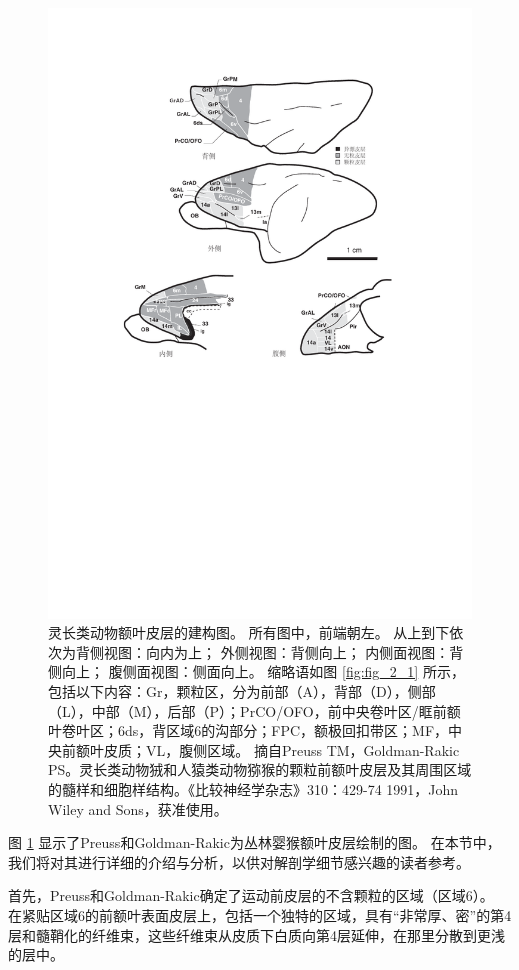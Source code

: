 \begin{figure}[!htb]
	\centering
	\includegraphics[width=0.8\linewidth]{image_pfc/Fig_2_3}
	\caption{灵长类动物额叶皮层的建构图。
		所有图中，前端朝左。
		从上到下依次为背侧视图：向内为上；
		外侧视图：背侧向上；
		内侧面视图：背侧向上；
		腹侧面视图：侧面向上。
		缩略语如图 \ref{fig:fig_2_1} 所示，包括以下内容：Gr，颗粒区，分为前部（A），背部（D），侧部（L），中部（M），后部（P）；PrCO/OFO，前中央卷叶区/眶前额叶卷叶区；6ds，背区域6的沟部分；FPC，额极回扣带区；MF，中央前额叶皮质；VL，腹侧区域。
		摘自Preuss TM，Goldman-Rakic PS。灵长类动物狨和人猿类动物猕猴的颗粒前额叶皮层及其周围区域的髓样和细胞样结构。《比较神经学杂志》310：429-74  1991，John Wiley and Sons，获准使用。\label{fig:fig_2_3}}
\end{figure}

图 \ref{fig:fig_2_3} 显示了Preuss和Goldman-Rakic为丛林婴猴额叶皮层绘制的图。
在本节中，我们将对其进行详细的介绍与分析，以供对解剖学细节感兴趣的读者参考。


首先，Preuss和Goldman-Rakic确定了运动前皮层的不含颗粒的区域（区域6）。
在紧贴区域6的前额叶表面皮层上，包括一个独特的区域，具有“非常厚、密”的第4层和髓鞘化的纤维束，这些纤维束从皮质下白质向第4层延伸，在那里分散到更浅的层中。


